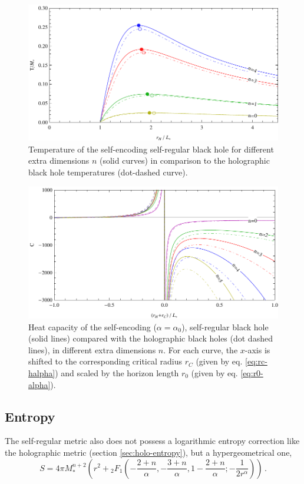 \documentclass[12pt,a4paper]{report}
\numberwithin{equation}{chapter}
\begin{document}
\begin{figure}
\includegraphics[scale=1]{figures/temperature-plot-halpha-n.pdf}
\caption[Temperature plot of the self-regular BH in comparison to the holographic BH]{Temperature of the self-encoding self-regular black hole for different extra dimensions $n$ (solid curves) in comparison to the holographic black hole temperatures (dot-dashed curve).}\label{fig:T-halpha}
\end{figure}
\begin{figure}
\includegraphics[scale=1]{figures/heat-capacity-plot-halpha-n.pdf}
\caption[Heat capacity $C_T$ comparison plot between holographic and self-regular BH]{Heat capacity of the self-encoding ($\alpha=\alpha_0$), self-regular black hole (solid lines) compared with the holographic black holes (dot dashed lines), in different extra dimensions $n$. For each curve, the $x$-axis is shifted to the corresponding critical radius $r_C$ (given by eq. \ref{eq:rc-halpha}) and scaled by the horizon length $r_0$ (given by eq. \ref{eq:r0-alpha}).}\label{fig:C-halpha}
\end{figure}



\subsection{Entropy}
The self-regular metric also does not possess a logarithmic entropy correction like the holographic metric (section \ref{sec:holo-entropy}), but a hypergeometrical one,
\begin{equation}
S = 4\pi M_*^{n+2}
\left(
r^2 + {}_2F_1
\left(
-\frac{2+n}{\alpha},
-\frac{3+n}{\alpha},
1-\frac{2+n}{\alpha};
-\frac 1{2 r^\alpha}
\right)
\right)\,.
\end{equation}
\end{document}
